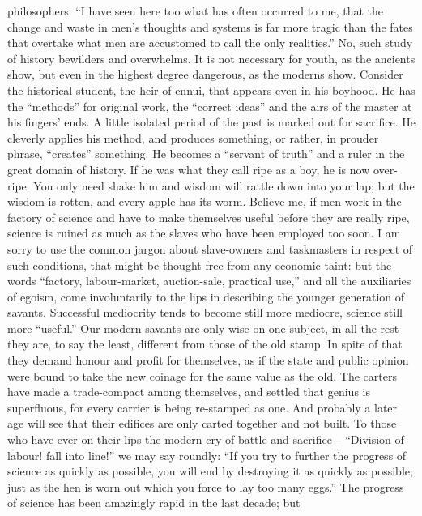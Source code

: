 philosophers: \enquote{I have seen here too what has often occurred to me,
that the change and waste in men's thoughts and systems is far more
tragic than the fates that overtake what men are accustomed to call
the only realities.} No, such study of history bewilders and
overwhelms. It is not necessary for youth, as the ancients show, but
even in the highest degree dangerous, as the moderns show. Consider
the historical student, the heir of ennui, that appears even in his
boyhood. He has the \enquote{methods} for original work, the \enquote{correct ideas}
and the airs of the master at his fingers' ends. A little isolated
period of the past is marked out for sacrifice. He cleverly applies
his method, and produces something, or rather, in prouder phrase,
\enquote{creates} something. He becomes a \enquote{servant of truth} and a ruler in
the great domain of history. If he was what they call ripe as a boy,
he is now over-ripe. You only need shake him and wisdom will rattle
down into your lap; but the wisdom is rotten, and every apple has its
worm. Believe me, if men work in the factory of science and have to
make themselves useful before they are really ripe, science is ruined
as much as the slaves who have been employed too soon. I am sorry to
use the common jargon about slave-owners and taskmasters in respect
of such conditions, that might be thought free from any economic
taint: but the words \enquote{factory, labour-market, auction-sale, practical
use,} and all the auxiliaries of egoism, come involuntarily to the
lips in describing the younger generation of savants. Successful
mediocrity tends to become still more mediocre, science still more
\enquote{useful.} Our modern savants are only wise on one subject, in all the
rest they are, to say the least, different from those of the old
stamp. In spite of that they demand honour and profit for themselves,
as if the state and public opinion were bound to take the new coinage
for the same value as the old. The carters have made a trade-compact
among themselves, and settled that genius is superfluous, for every
carrier is being re-stamped as one. And probably a later age will see
that their edifices are only carted together and not built. To those
who have ever on their lips the modern cry of battle and
sacrifice -- \enquote{Division of labour! fall into line!} we may say roundly:
\enquote{If you try to further the progress of science as quickly as
possible, you will end by destroying it as quickly as possible; just
as the hen is worn out which you force to lay too many eggs.} The
progress of science has been amazingly rapid in the last decade; but
